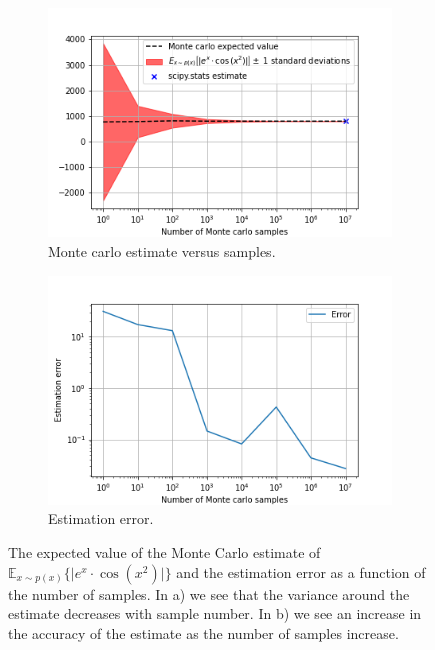 \documentclass{article}
\begin{document}
\begin{figure}[!htb]
     \centering
     \begin{subfigure}[b]{0.45\textwidth}
         \centering
         \includegraphics[width=\textwidth]{Q1a_fig11.png}
         \caption{Monte carlo estimate versus samples.}
     \end{subfigure}
     \hfill
     \begin{subfigure}[b]{0.45\textwidth}
         \centering
         \includegraphics[width=\textwidth]{Q1a_fig12.png}
         \caption{Estimation error.}
     \end{subfigure}
        \caption{The expected value of the Monte Carlo estimate of $\mathbb{E}_{x\sim p(x)}\{\vert e^x \cdot \cos \left( x^2 \right) \vert \}$ and the estimation error as a function of the number of samples. In a) we see that the variance around the estimate decreases with sample number. In b) we see an increase in the accuracy of the estimate as the number of samples increase.}
        \label{fig:Q1a_6}
\end{figure}
\end{document}
